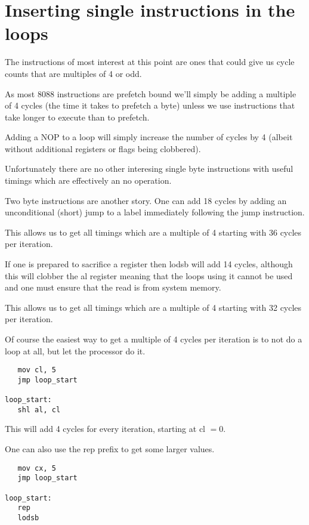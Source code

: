 \documentclass[a4paper,10pt]{amsart}
\begin{document}
\section{Inserting single instructions in the loops}

The instructions of most interest at this point are ones that could give us
cycle counts that are multiples of 4 or odd.

As most 8088 instructions are prefetch bound we'll simply be adding a multiple
of 4 cycles (the time it takes to prefetch a byte) unless we use instructions
that take longer to execute than to prefetch.

Adding a NOP to a loop will simply increase the number of cycles by 4 (albeit
without additional registers or flags being clobbered).

Unfortunately there are no other interesing single byte instructions with
useful timings which are effectively an no operation.

Two byte instructions are another story. One can add 18 cycles by adding an
unconditional (short) jump to a label immediately following the jump
instruction.

This allows us to get all timings which are a multiple of 4 starting with 36
cycles per iteration.

If one is prepared to sacrifice a register then lodsb will add 14 cycles,
although this will clobber the al register meaning that the loops using it
cannot be used and one must ensure that the read is from system memory.

This allows us to get all timings which are a multiple of 4 starting with 32
cycles per iteration.

Of course the easiest way to get a multiple of 4 cycles per iteration is to
not do a loop at all, but let the processor do it.

\begin{lstlisting}
   mov cl, 5
   jmp loop_start

loop_start:
   shl al, cl
\end{lstlisting}

This will add 4 cycles for every iteration, starting at cl $= 0$.

One can also use the rep prefix to get some larger values.

\begin{lstlisting}
   mov cx, 5
   jmp loop_start

loop_start:
   rep
   lodsb
\end{lstlisting}
\end{document}
